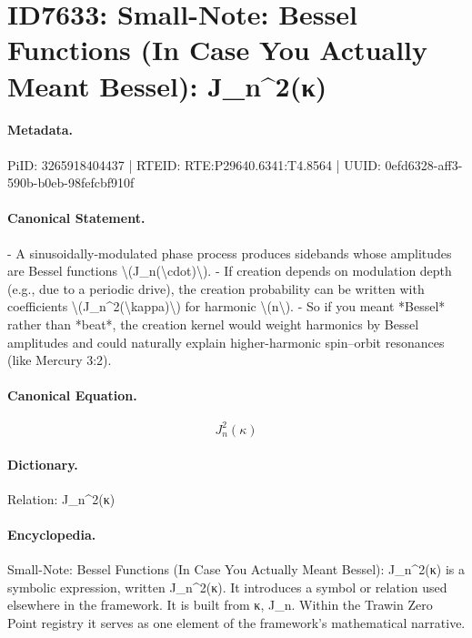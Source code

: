 \section*{ID7633: Small-Note: Bessel Functions (In Case You Actually Meant Bessel): J\_n\textasciicircum{}2(κ)}
\paragraph{Metadata.}
PiID: 3265918404437 | RTEID: RTE:P29640.6341:T4.8564 | UUID: 0efd6328-aff3-590b-b0eb-98fefcbf910f

\paragraph{Canonical Statement.}
- A sinusoidally-modulated phase process produces sidebands whose amplitudes are Bessel functions \textbackslash{}(J\_n(\textbackslash{}cdot)\textbackslash{}). - If creation depends on modulation depth (e.g., due to a periodic drive), the creation probability can be written with coefficients \textbackslash{}(J\_n\textasciicircum{}2(\textbackslash{}kappa)\textbackslash{}) for harmonic \textbackslash{}(n\textbackslash{}). - So if you meant *Bessel* rather than *beat*, the creation kernel would weight harmonics by Bessel amplitudes and could naturally explain higher-harmonic spin–orbit resonances (like Mercury 3:2).

\paragraph{Canonical Equation.}
\[
J_n^2(\kappa)
\]

\paragraph{Dictionary.}
Relation: J\_n\textasciicircum{}2(κ)

\paragraph{Encyclopedia.}
Small-Note: Bessel Functions (In Case You Actually Meant Bessel): J\_n\textasciicircum{}2(κ) is a symbolic expression, written J\_n\textasciicircum{}2(κ). It introduces a symbol or relation used elsewhere in the framework. It is built from κ, J\_n. Within the Trawin Zero Point registry it serves as one element of the framework's mathematical narrative.
